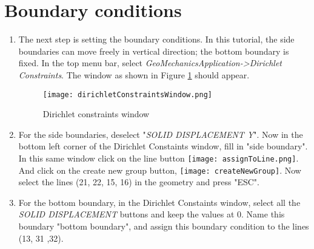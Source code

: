 \section{Boundary conditions}

\begin{enumerate}[resume]


	\item The next step is setting the boundary conditions. In this tutorial, the side boundaries can move freely in vertical direction; the bottom boundary is fixed. In the top menu bar, select \textit{GeoMechanicsApplication->Dirichlet Constraints}. The window as shown in Figure \ref{fig:tut1_dirichlet_constraints_window} should appear. 
	\begin{figure}[h!]		
		\texttt{[image: dirichletConstraintsWindow.png]}
		\caption{Dirichlet constraints window}
		\label{fig:tut1_dirichlet_constraints_window}
	\end{figure}

	\item For the side boundaries, deselect "\textit{SOLID DISPLACEMENT Y}". Now in the bottom left corner of the Dirichlet Constaints window, fill in "side boundary". In this same window click on the line button \texttt{[image: assignToLine.png]}. And click on the create new group button, \texttt{[image: createNewGroup]}. Now select the lines (21, 22, 15, 16) in the geometry and press "ESC".
	
	\item For the bottom boundary, in the Dirichlet Constaints window, select all the \textit{SOLID DISPLACEMENT} buttons and keep the values at 0. Name this boundary "bottom boundary", and assign this boundary condition to the lines (13, 31 ,32).
\end{enumerate}
